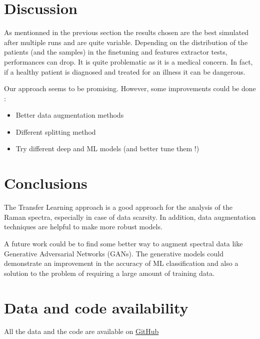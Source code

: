 \section{Discussion}

As mentionned in the previous section the results chosen are the best simulated after multiple runs and are quite variable. Depending on the distribution of the patients (and the samples) in the finetuning and features extractor tests, performances can drop.
It is quite problematic as it is a medical concern. 
In fact, if a healthy patient is diagnosed and treated for an illness it can be dangerous.

Our approach seems to be promising. However, some improvements could be done :
\begin{itemize}
\item Better data augmentation methods
\item Different splitting method
\item Try different deep and ML models (and better tune them !)
\end{itemize}

\section{Conclusions}

The Transfer Learning approach is a good approach for the analysis of the Raman spectra, especially in case of data scarsity. In addition, data augmentation techniques are helpful to make more robust models. 

A future work could be to find some better way to augment spectral data like Generative Adversarial Networks (GANs). The generative models could demonstrate an improvement in the accuracy of ML classification and also a solution to the problem of requiring a large amount of training data.

\section{Data and code availability}
All the data and the code are available on \href{https://github.com/nsgln/Deep-Learning-Raman-Spectroscopy}{GitHub}

